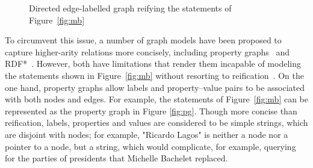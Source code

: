 \begin{figure}[t]
\setlength{\vgap}{0.45cm}
\setlength{\hgap}{2.5cm}
\centering
{}
\caption{Directed edge-labelled graph reifying the statements of Figure~\ref{fig:mb} \label{fig:delg}}
\end{figure}



To circumvent this issue, a number of graph models have been proposed to capture higher-arity relations more concisely, including property graphs~\cite{FrancisGGLLMPRS18} and RDF*~\cite{Hartig17,Hartig21}. However, both have limitations that render them incapable of modeling the statements shown in Figure~\ref{fig:mb} without resorting to reification~\cite{HoganRRS19}. On the one hand, property graphs allow labels and property--value pairs to be associated with both nodes and edges. For example, the statements of Figure~\ref{fig:mb} can be represented as the property graph in Figure \ref{fig:pg}. 
Though more concise than reification, labels, properties and values are considered to be simple strings, which are disjoint with nodes; for example, \textsf{"Ricardo Lagos"} is neither a node nor a pointer to a node, but a string, which would complicate, for example, querying for the parties of presidents that Michelle Bachelet replaced. 

